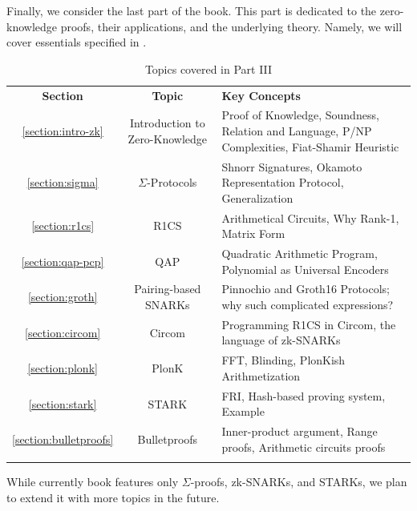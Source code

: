 \documentclass[../../lecture-notes-148x210.tex]{subfiles}
\begin{document}
Finally, we consider the last part of the book. This part is dedicated to the
zero-knowledge proofs, their applications, and the underlying theory. Namely, we
will cover essentials specified in .

\begin{table}[H]
    \centering
    \begin{tabularx}{\textwidth}{ccX}
        \Xhline{3\arrayrulewidth}
        \rowcolor{purple!30}\textbf{Section} & \textbf{Topic} & \textbf{Key Concepts} \\
        \Xhline{3\arrayrulewidth}
        \rowcolor{purple!10}\ref{section:intro-zk} & Introduction to Zero-Knowledge & Proof of Knowledge, 
        Soundness, Relation and Language, P/NP Complexities, Fiat-Shamir Heuristic  \\
        \hdashline
        \rowcolor{purple!20}\ref{section:sigma} & $\Sigma$-Protocols &
        Shnorr Signatures, Okamoto Representation Protocol, Generalization \\
        \hdashline
        \rowcolor{purple!10}\ref{section:r1cs} & R1CS & Arithmetical Circuits, Why Rank-1, Matrix Form \\
        \hdashline
        \rowcolor{purple!20}\ref{section:qap-pcp} & QAP & Quadratic Arithmetic Program, Polynomial as Universal Encoders \\
        \hdashline
        \rowcolor{purple!10}\ref{section:groth} & Pairing-based SNARKs & Pinnochio and Groth16 Protocols; why such complicated expressions? \\
        \hdashline
        \rowcolor{purple!20}\ref{section:circom} & Circom & Programming R1CS in Circom, the language of zk-SNARKs \\
        \hdashline
        \rowcolor{purple!10}\ref{section:plonk} & PlonK & FFT, Blinding, PlonKish Arithmetization \\
        \hdashline
        \rowcolor{purple!20}\ref{section:stark} & STARK & FRI, Hash-based proving system, Example \\
        \hdashline
        \rowcolor{purple!10}\ref{section:bulletproofs} & Bulletproofs & Inner-product argument, Range proofs, Arithmetic circuits proofs \\
        \Xhline{3\arrayrulewidth}
    \end{tabularx}
    \caption{Topics covered in Part III}
    \label{tab:essentialls-3}
\end{table}

While currently book features only $\Sigma$-proofs, zk-SNARKs, and STARKs, we
plan to extend it with more topics in the future. 
\end{document}
